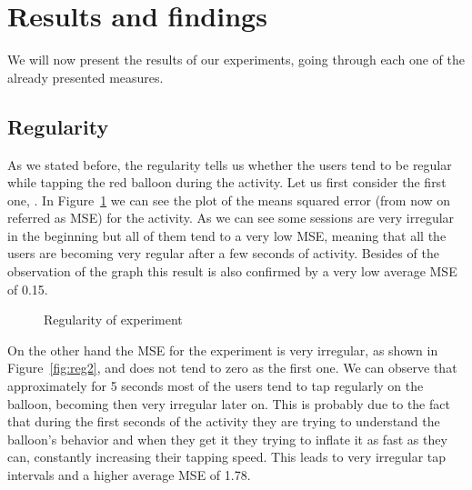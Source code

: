 \section{Results and findings}
We will now present the results of our experiments, going through each one of the already presented measures.

\subsection{Regularity}
As we stated before, the regularity tells us whether the users tend to be regular while tapping the red balloon during the activity. Let us first consider the first one, \testfirst. In Figure~\ref{fig:reg1} we can see the plot of the means squared error (from now on referred as MSE) for the activity. As we can see some sessions are very irregular in the beginning but all of them tend to a very low MSE, meaning that all the users are becoming very regular after a few seconds of activity. Besides of the observation of the graph this result is also confirmed by a very low average MSE of 0.15.


\begin{figure}[h!t]
\centering
	{\setlength{\fboxsep}{1.5pt}
	 }
\caption{Regularity of \testfirst experiment}
\label{fig:reg1}
\end{figure}

On the other hand the MSE for the \testsecond experiment is very irregular, as shown in Figure~\ref{fig:reg2}, and does not tend to zero as the first one. We can observe that approximately for 5 seconds most of the users tend to tap regularly on the balloon, becoming then very irregular later on. This is probably due to the fact that during the first seconds of the activity they are trying to understand the balloon's behavior and when they get it they trying to inflate it as fast as they can, constantly increasing their tapping speed. This leads to very irregular tap intervals and a higher average MSE of 1.78.

